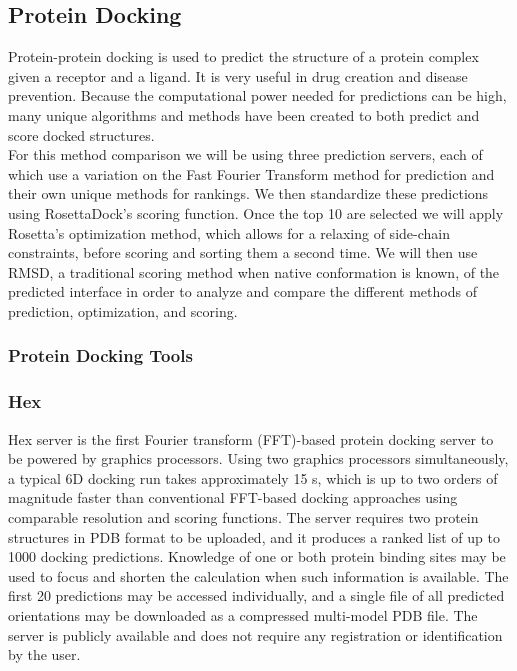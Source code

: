 \documentclass{article}
\begin{document}
\subsection{Protein Docking}

Protein-protein docking is used to predict the structure of a protein complex given a receptor and a ligand. It is very useful in drug creation and disease prevention. Because the computational power needed for predictions can be high, many unique algorithms and methods have been created to both predict and score docked structures.\\

For this method comparison we will be using three prediction servers, each of which use a variation on the Fast Fourier Transform method for prediction and their own unique methods for rankings. We then standardize these predictions using RosettaDock's scoring function. Once the top 10 are selected we will apply Rosetta's optimization method, which allows for a relaxing of side-chain constraints, before scoring and sorting them a second time. We will then use RMSD, a traditional scoring method when native conformation is known, of the predicted interface in order to analyze and compare the different methods of prediction, optimization, and scoring.

\subsubsection{Protein Docking Tools}

\subsubsection*{Hex}

Hex server is the first Fourier transform (FFT)-based protein docking server to be powered by graphics processors. Using two graphics processors simultaneously, a typical 6D docking run takes approximately 15 s, which is up to two orders of magnitude faster than conventional FFT-based docking approaches using comparable resolution and scoring functions. The server requires two protein structures in PDB format to be uploaded, and it produces a ranked list of up to 1000 docking predictions. Knowledge of one or both protein binding sites may be used to focus and shorten the calculation when such information is available. The first 20 predictions may be accessed individually, and a single file of all predicted orientations may be downloaded as a compressed multi-model PDB file. The server is publicly available and does not require any registration or identification by the user.
\end{document}
